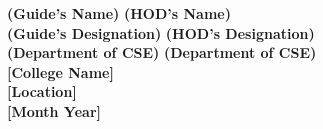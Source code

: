 \documentclass[12pt, a4paper]{report}
\begin{document}
\begin{titlepage}
\begin{center}
			\vspace{0.1in}
			\textbf{(Guide's Name)} \hspace{2.7in} \textbf{(HOD's Name)}\\
			\vspace{0.1in}
			\textbf{(Guide's Designation)} \hspace{2in} \textbf{(HOD's Designation)}\\
			\vspace{0.1in}
			\textbf{(Department of CSE)} \hspace{2.1in} \textbf{(Department of CSE)}\\
			\vspace{0.1in}
			\textbf{[College Name]}\\
			\vspace{0.1in}
			\textbf{[Location]}\\
			\vspace{0.1in}
			\textbf{[Month Year]} %
		\end{center}
	\end{titlepage}
	
\end{document}

